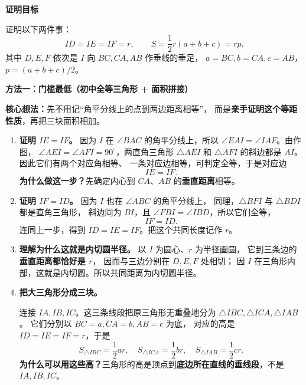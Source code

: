 \begin{proofbox}
\textbf{\textcolor{CProof}{证明目标}}

证明以下两件事：
\[
 \boxed{ID=IE=IF=r},\qquad
 \boxed{S=\frac12r(a+b+c)=rp}.
\]
其中 $D,E,F$ 依次是 $I$ 向 $BC,CA,AB$ 作垂线的垂足，
$a=BC,b=CA,c=AB$，$p=(a+b+c)/2$。

\medskip
\par\noindent\begin{minipage}{\linewidth}
\textbf{\textcolor{CProof}{方法一：门槛最低（初中全等三角形 + 面积拼接）}}

\PAngleFigure
\end{minipage}\par
\textbf{核心想法：}先不用记“角平分线上的点到两边距离相等”，
而是\textbf{亲手证明这个等距性质}，再把三块面积相加。
\begin{enumerate}[leftmargin=*,itemsep=0.7em]
 \item \textbf{证明 $IE=IF$。}
 因为 $I$ 在 $\angle BAC$ 的角平分线上，所以
 $\angle EAI=\angle IAF$。由作图，
 $\angle AEI=\angle AFI=90^\circ$，两直角三角形 $\triangle AEI$ 和
 $\triangle AFI$ 的斜边都是 $AI$。因此它们有两个对应角相等、
 一条对应边相等，可判定全等，于是对应边
 \[
  IE=IF.
 \]
 \textbf{为什么做这一步？}先确定内心到 $CA$、$AB$ 的\textbf{垂直距离}相等。

 \item \textbf{证明 $IF=ID$。}
 因为 $I$ 也在 $\angle ABC$ 的角平分线上，
 同理，$\triangle BFI$ 与 $\triangle BDI$ 都是直角三角形，
 斜边同为 $BI$，且 $\angle FBI=\angle IBD$，所以它们全等，
 \[
  IF=ID.
 \]
 连同上一步，得到 $ID=IE=IF$。把这个共同长度记作 $r$。

 \item \textbf{理解为什么这就是内切圆半径。}
 以 $I$ 为圆心、$r$ 为半径画圆，
 它到三条边的\textbf{垂直距离都恰好是 $r$}，
 因而与三边分别在 $D,E,F$ 处相切；
 因 $I$ 在三角形内部，这就是内切圆。所以共同距离为内切圆半径。

 \item \textbf{把大三角形分成三块。}

 连接 $IA,IB,IC$。这三条线段把原三角形无重叠地分为
 $\triangle IBC,\triangle ICA,\triangle IAB$。
 它们分别以 $BC=a,CA=b,AB=c$ 为底，
 对应的高是 $ID=IE=IF=r$，于是
 \[
   S_{\triangle IBC}=\frac12 ar,\quad
   S_{\triangle ICA}=\frac12 br,\quad
   S_{\triangle IAB}=\frac12 cr.
 \]
 \textbf{为什么可以用这些高？}三角形的高是顶点到\textbf{底边所在直线的垂线段}，不是 $IA,IB,IC$。


\end{enumerate}
\end{proofbox}
